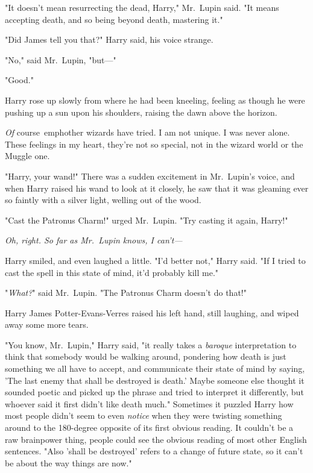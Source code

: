"It doesn't mean resurrecting the dead, Harry," Mr.~Lupin said. "It means 
accepting death, and so being beyond death, mastering it."

"Did James tell you that?" Harry said, his voice strange.

"No," said Mr.~Lupin, "but---"

"Good."

Harry rose up slowly from where he had been kneeling, feeling as though he were 
pushing up a sun upon his shoulders, raising the dawn above the horizon.

\emph{Of} course\ emph{other wizards have tried. I am not unique. I was never 
alone. These feelings in my heart, they're not so special, not in the wizard 
world or the Muggle one.}

"Harry, your wand!" There was a sudden excitement in Mr.~Lupin's voice, and 
when Harry raised his wand to look at it closely, he saw that it was gleaming 
ever so faintly with a silver light, welling out of the wood.

"Cast the Patronus Charm!" urged Mr.~Lupin. "Try casting it again, Harry!"

\emph{Oh, right. So far as Mr.~Lupin knows, I can't---}

Harry smiled, and even laughed a little. "I'd better not," Harry said. "If I 
tried to cast the spell in this state of mind, it'd probably kill me."

"\emph{What?}" said Mr.~Lupin. "The Patronus Charm doesn't do that!"

Harry James Potter-Evans-Verres raised his left hand, still laughing, and wiped 
away some more tears.

"You know, Mr.~Lupin," Harry said, "it really takes a \emph{baroque} 
interpretation to think that somebody would be walking around, pondering how 
death is just something we all have to accept, and communicate their state of 
mind by saying, 'The last enemy that shall be destroyed is death.' Maybe 
someone else thought it sounded poetic and picked up the phrase and tried to 
interpret it differently, but whoever said it first didn't like death much." 
Sometimes it puzzled Harry how most people didn't seem to even \emph{notice} 
when they were twisting something around to the 180-degree opposite of its 
first obvious reading. It couldn't be a raw brainpower thing, people could see 
the obvious reading of most other English sentences. "Also 'shall be destroyed' 
refers to a change of future state, so it can't be about the way things are 
now."

